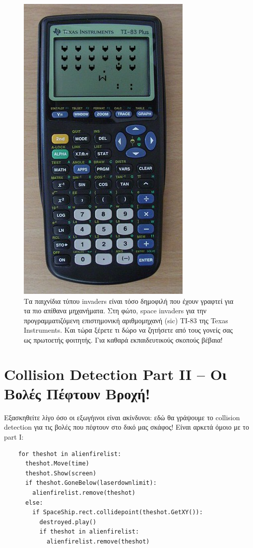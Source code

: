 \begin{figure}
\centering
\includegraphics[height=0.95\textheight]{images/chapter9/calculator-invaders}
\caption[Calculator Invaders]{Τα παιχνίδια τύπου invaders είναι τόσο δημοφιλή που έχουν γραφτεί για τα πιο απίθανα μηχανήματα. Στη φώτο, space invaders για την προγραμματιζόμενη επιστημονική αριθμομηχανή (sic) ΤΙ-83 της Texas Instruments. Και τώρα ξέρετε τι δώρο να ζητήσετε από τους γονείς σας ως πρωτοετής φοιτητής. Για καθαρά εκπαιδευτικούς σκοπούς βέβαια!}
\label{9-2}
\end{figure}

%
\section{Collision Detection Part II -- Οι Βολές Πέφτουν Βροχή!}
%
Εξασκηθείτε λίγο όσο οι εξωγήινοι είναι ακίνδυνοι: εδώ θα γράψουμε το collision detection για τις βολές που πέφτουν στο δικό μας σκάφος!  Είναι αρκετά όμοιο με το part I:

\begin{verbatim}
    for theshot in alienfirelist:
      theshot.Move(time)
      theshot.Show(screen)
      if theshot.GoneBelow(laserdownlimit):
        alienfirelist.remove(theshot)
      else:
        if SpaceShip.rect.collidepoint(theshot.GetXY()):
          destroyed.play()
          if theshot in alienfirelist:
            alienfirelist.remove(theshot)
\end{verbatim}

